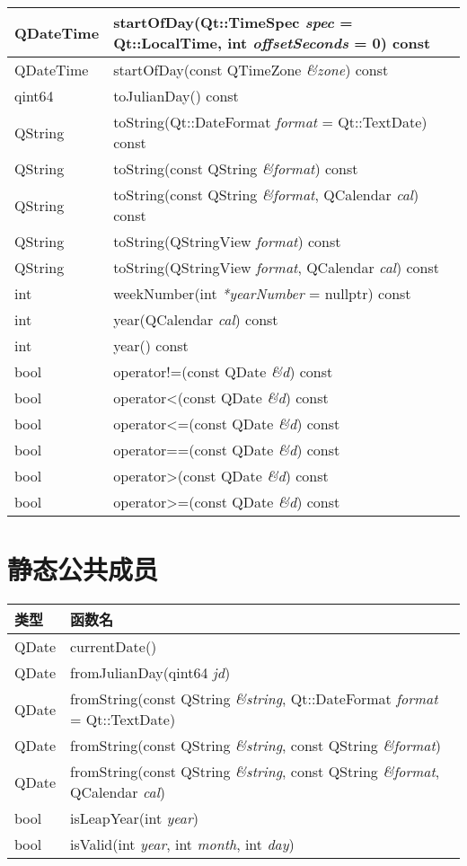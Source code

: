 \begin{longtable}[l]{|l|m{30em}|}
\hline
QDateTime&	startOfDay(Qt::TimeSpec \emph{spec} = Qt::LocalTime, int \emph{offsetSeconds} = 0) const\\
\hline
QDateTime&	startOfDay(const QTimeZone \emph{\&zone}) const\\
\hline
qint64&	toJulianDay() const\\
\hline
QString&	toString(Qt::DateFormat \emph{format} = Qt::TextDate) const\\
\hline
QString&	toString(const QString \emph{\&format}) const\\
\hline
QString&	toString(const QString \emph{\&format}, QCalendar \emph{cal}) const\\
\hline
QString&	toString(QStringView \emph{format}) const\\
\hline
QString&	toString(QStringView \emph{format}, QCalendar \emph{cal}) const\\
\hline
int&	weekNumber(int \emph{*yearNumber} = nullptr) const\\
\hline
int&	year(QCalendar \emph{cal}) const\\
\hline
int&	year() const\\
\hline
bool&	operator!=(const QDate \emph{\&d}) const\\
\hline
bool&	operator<(const QDate \emph{\&d}) const\\
\hline
bool&	operator<=(const QDate \emph{\&d}) const\\
\hline
bool&	operator==(const QDate \emph{\&d}) const\\
\hline
bool&	operator>(const QDate \emph{\&d}) const\\
\hline
bool&	operator>=(const QDate \emph{\&d}) const\\
\hline
\end{longtable}

\section{静态公共成员}

\begin{tabular}{|l|l|}
\hline
类型&	函数名\\
\hline
QDate&	currentDate()\\
\hline
QDate&	fromJulianDay(qint64 \emph{jd})\\
\hline
QDate&	fromString(const QString \emph{\&string}, Qt::DateFormat \emph{format} = Qt::TextDate)\\
\hline
QDate&	fromString(const QString \emph{\&string}, const QString \emph{\&format})\\
\hline
QDate&	fromString(const QString \emph{\&string}, const QString \emph{\&format}, QCalendar \emph{cal})\\
\hline
bool&	isLeapYear(int \emph{year})\\
\hline
bool&	isValid(int \emph{year}, int \emph{month}, int \emph{day})\\
\hline
\end{tabular}

